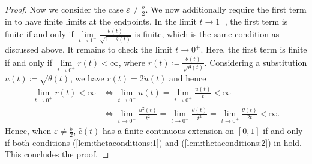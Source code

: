 \begin{proof}
  Now we consider the case \(\varepsilon \neq \frac{b}{2}\). We now additionally require the first term in  to have finite limits at the endpoints. In the limit \(t \to 1^{-}\), the first term is finite if and only if  \(\lim\limits_{t \to 1^{-}} \frac{\dot{\theta}(t)}{\sqrt{1-\theta(t)}} \) is finite, which is the same condition as discussed above. It remains to check the limit \(t \to 0^{+}\). Here, the first term is finite if and only if \(\lim\limits_{t \to 0^{+}} r(t) < \infty\), where \(r(t) \coloneqq \frac{\dot{\theta}(t)}{\sqrt{\theta(t)}}\). Considering a substitution \(u(t) \coloneqq \sqrt{\theta(t)}\), we have \(r(t) = 2 \dot{u}(t)\) and hence
  \begin{align*}
    \lim\limits_{t \to 0^{+}}  r(t) < \infty &\iff \lim\limits_{t \to 0^{+}}  \dot{u}(t) = \lim\limits_{t \to 0^{+}}  \frac{u(t)}{t} < \infty \\
    &\iff \lim\limits_{t \to 0^{+}}  \frac{u^{2}(t)}{t^{2}} = \lim\limits_{t \to 0^{+}} \frac{\theta(t)}{t^{2}} = \lim\limits_{t \to 0^{+}} \frac{\dot{\theta}(t)}{2t} < \infty.
  \end{align*}
  Hence, when \(\varepsilon \neq \frac{b}{2}\), \(\hat{c}(t)\) has a finite continuous extension on \([0, 1]\) if and only if both conditions (\ref{lem:thetaconditions:1}) and (\ref{lem:thetaconditions:2}) in  hold. This concludes the proof.
\end{proof}
